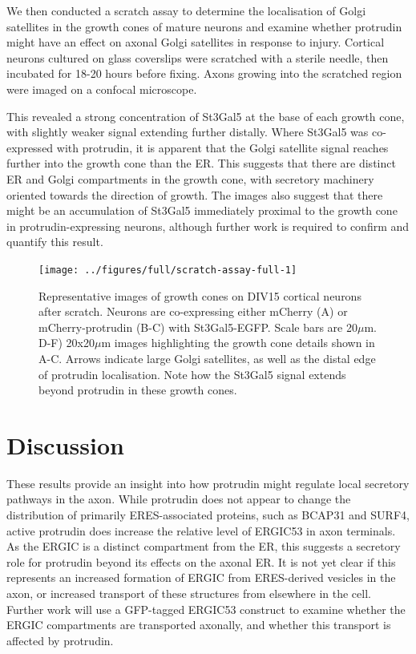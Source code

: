 \documentclass[
  12pt,
  a4paper,
]{book}
\begin{document}
We then conducted a scratch assay to determine the localisation of Golgi satellites in the growth cones of mature neurons and examine whether protrudin might have an effect on axonal Golgi satellites in response to injury. Cortical neurons cultured on glass coverslips were scratched with a sterile needle, then incubated for 18-20 hours before fixing. Axons growing into the scratched region were imaged on a confocal microscope.

This revealed a strong concentration of St3Gal5 at the base of each growth cone, with slightly weaker signal extending further distally. Where St3Gal5 was co-expressed with protrudin, it is apparent that the Golgi satellite signal reaches further into the growth cone than the ER. This suggests that there are distinct ER and Golgi compartments in the growth cone, with secretory machinery oriented towards the direction of growth. The images also suggest that there might be an accumulation of St3Gal5 immediately proximal to the growth cone in protrudin-expressing neurons, although further work is required to confirm and quantify this result.

\begin{figure}
\texttt{[image: ../figures/full/scratch-assay-full-1]} \caption[Scratch assay of neurons co-expressing protrudin and St3Gal5]{Representative images of growth cones on DIV15 cortical neurons after scratch.  Neurons are co-expressing either mCherry (A) or mCherry-protrudin (B-C) with St3Gal5-EGFP.  Scale bars are 20$\mu$m.  D-F) 20x20$\mu$m images highlighting the growth cone details shown in A-C.  Arrows indicate large Golgi satellites, as well as the distal edge of protrudin localisation.  Note how the St3Gal5 signal extends beyond protrudin in these growth cones.}\label{fig:scratch-assay-full}
\end{figure}

\hypertarget{discussion-1}{%
\section{Discussion}\label{discussion-1}}

These results provide an insight into how protrudin might regulate local secretory pathways in the axon. While protrudin does not appear to change the distribution of primarily ERES-associated proteins, such as BCAP31 and SURF4, active protrudin does increase the relative level of ERGIC53 in axon terminals. As the ERGIC is a distinct compartment from the ER, this suggests a secretory role for protrudin beyond its effects on the axonal ER. It is not yet clear if this represents an increased formation of ERGIC from ERES-derived vesicles in the axon, or increased transport of these structures from elsewhere in the cell. Further work will use a GFP-tagged ERGIC53 construct to examine whether the ERGIC compartments are transported axonally, and whether this transport is affected by protrudin.
\end{document}
